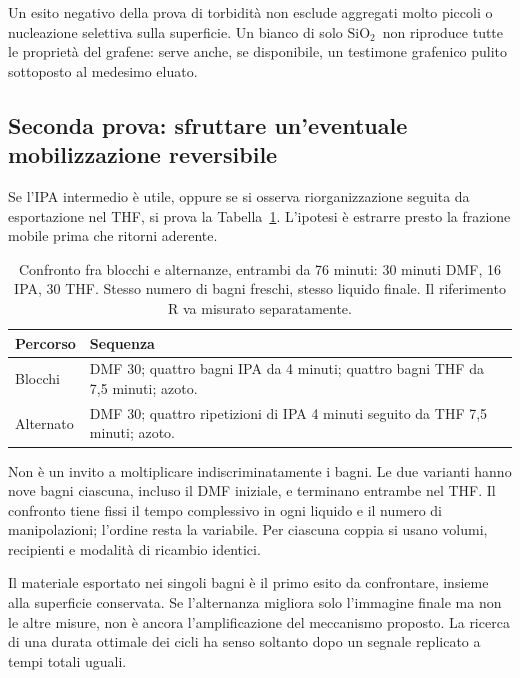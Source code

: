 \documentclass[11pt,reqno]{amsart}
\numberwithin{equation}{section}
\newcommand{\SiO}{\ensuremath{\mathrm{SiO}_2}}
\begin{document}
Un esito negativo della prova di torbidit\`a non esclude
aggregati molto piccoli o nucleazione selettiva sulla superficie.
Un bianco di solo \SiO\ non riproduce tutte le propriet\`a
del grafene: serve anche, se disponibile, un testimone grafenico
pulito sottoposto al medesimo eluato.

\subsection{Seconda prova: sfruttare un'eventuale mobilizzazione reversibile}
Se l'IPA intermedio \`e utile, oppure se si osserva riorganizzazione
seguita da esportazione nel THF, si prova la
Tabella~\ref{tab:cycles}. L'ipotesi \`e estrarre presto la
frazione mobile prima che ritorni aderente.

\begin{table}[htbp]
\caption{Confronto fra blocchi e alternanze, entrambi da 76 minuti:
30 minuti DMF, 16 IPA, 30 THF. Stesso numero di bagni freschi,
stesso liquido finale. Il riferimento R va misurato separatamente.}
\label{tab:cycles}\centering\small
\begin{tabular}{@{}p{}p{}@{}}\toprule
Percorso & Sequenza\\\midrule
Blocchi & DMF 30; quattro bagni IPA da 4 minuti;
quattro bagni THF da 7,5 minuti; azoto.\\[4pt]
Alternato & DMF 30; quattro ripetizioni di IPA 4 minuti
seguito da THF 7,5 minuti; azoto.\\\bottomrule
\end{tabular}
\end{table}

Non \`e un invito a moltiplicare indiscriminatamente i bagni.
Le due varianti hanno nove bagni ciascuna, incluso il DMF
iniziale, e terminano entrambe nel THF. Il confronto tiene
fissi il tempo complessivo in ogni liquido e il numero di
manipolazioni; l'ordine resta la variabile. Per ciascuna coppia
si usano volumi, recipienti e modalit\`a di ricambio identici.

Il materiale esportato nei singoli bagni \`e il primo esito
da confrontare, insieme alla superficie conservata. Se
l'alternanza migliora solo l'immagine finale ma non le altre
misure, non \`e ancora l'amplificazione del meccanismo proposto.
La ricerca di una durata ottimale dei cicli ha senso soltanto
dopo un segnale replicato a tempi totali uguali.
\end{document}
